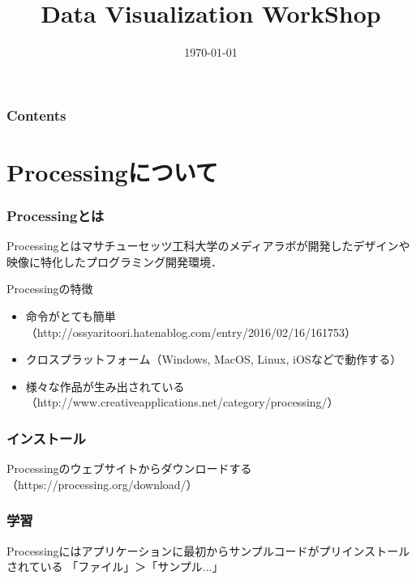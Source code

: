 \documentclass[dvipdfmx]{beamer}
\title{Data Visualization WorkShop}
\author{}
\institute[所属]{}
\date{\today}
\begin{document}
    \begin{frame}[plain]
        \frametitle{}
	    \titlepage
    \end{frame}

    \begin{frame}
        \frametitle{Contents}
        \tableofcontents
    \end{frame}

    \section{Processingについて}
        \begin{frame}
            \frametitle{Processingとは}
            Processingとはマサチューセッツ工科大学のメディアラボが開発したデザインや映像に特化したプログラミング開発環境．
            \begin{block}{Processingの特徴}
                \begin{itemize}
                    \item 命令がとても簡単（http://ossyaritoori.hatenablog.com/entry/2016/02/16/161753）
                    \item クロスプラットフォーム（Windows, MacOS, Linux, iOSなどで動作する）
                    \item 様々な作品が生み出されている（http://www.creativeapplications.net/category/processing/）
                \end{itemize}
            \end{block}
        \end{frame}

        \begin{frame}
            \frametitle{インストール}
            Processingのウェブサイトからダウンロードする（https://processing.org/download/）
        \end{frame}

        \begin{frame}
            \frametitle{学習}
            Processingにはアプリケーションに最初からサンプルコードがプリインストールされている
            「ファイル」＞「サンプル...」
        \end{frame}
\end{document}
